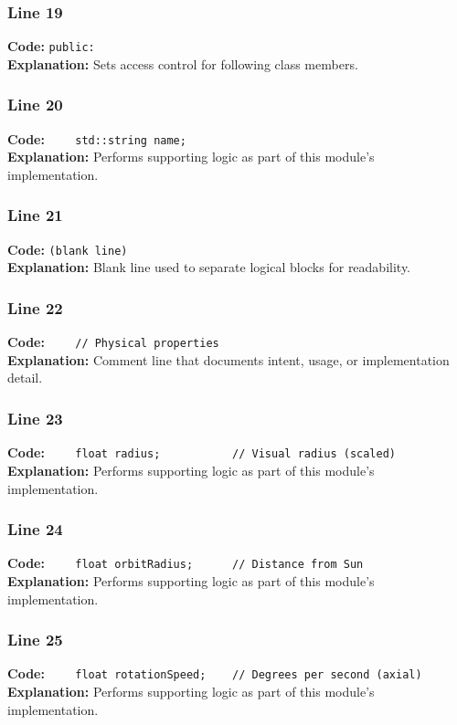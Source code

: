 \documentclass[11pt,a4paper]{article}
\begin{document}
\subsubsection*{Line 19}
\textbf{Code:} \verb|public:|\\
\textbf{Explanation:} Sets access control for following class members.

\subsubsection*{Line 20}
\textbf{Code:} \verb|    std::string name;|\\
\textbf{Explanation:} Performs supporting logic as part of this module's implementation.

\subsubsection*{Line 21}
\textbf{Code:} \texttt{(blank line)}\\
\textbf{Explanation:} Blank line used to separate logical blocks for readability.

\subsubsection*{Line 22}
\textbf{Code:} \verb|    // Physical properties|\\
\textbf{Explanation:} Comment line that documents intent, usage, or implementation detail.

\subsubsection*{Line 23}
\textbf{Code:} \verb|    float radius;           // Visual radius (scaled)|\\
\textbf{Explanation:} Performs supporting logic as part of this module's implementation.

\subsubsection*{Line 24}
\textbf{Code:} \verb|    float orbitRadius;      // Distance from Sun|\\
\textbf{Explanation:} Performs supporting logic as part of this module's implementation.

\subsubsection*{Line 25}
\textbf{Code:} \verb|    float rotationSpeed;    // Degrees per second (axial)|\\
\textbf{Explanation:} Performs supporting logic as part of this module's implementation.
\end{document}
